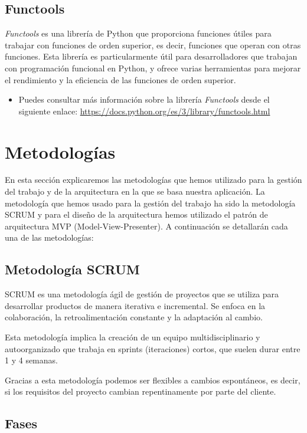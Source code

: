 \subsection{Functools}

\textit{Functools} es una librería de Python que proporciona funciones útiles para trabajar con funciones de orden superior, es decir, funciones que operan con otras funciones. Esta librería es particularmente útil para desarrolladores que trabajan con programación funcional en Python, y ofrece varias herramientas para mejorar el rendimiento y la eficiencia de las funciones de orden superior.

\begin{itemize}
    \item Puedes consultar más información sobre la librería \textit{Functools} desde el siguiente enlace: \url{https://docs.python.org/es/3/library/functools.html}
\end{itemize}

\section{Metodologías}

En esta sección explicaremos las metodologías que hemos utilizado para la gestión del trabajo y de la arquitectura en la que se basa nuestra aplicación. La metodología que hemos usado para la gestión del trabajo ha sido la metodología SCRUM y para el diseño de la arquitectura hemos utilizado el patrón de arquitectura MVP (Model-View-Presenter). A continuación se detallarán cada una de las metodologías: 


\subsection{Metodología SCRUM}
SCRUM es una metodología ágil de gestión de proyectos que se utiliza para desarrollar productos de manera iterativa e incremental. Se enfoca en la colaboración, la retroalimentación constante y la adaptación al cambio.

Esta metodología implica la creación de un equipo multidisciplinario y autoorganizado que trabaja en sprints (iteraciones) cortos, que suelen durar entre 1 y 4 semanas. 

Gracias a esta metodología podemos ser flexibles a cambios espontáneos, es decir, si los requisitos del proyecto cambian repentinamente por parte del cliente.

\subsection{Fases}

